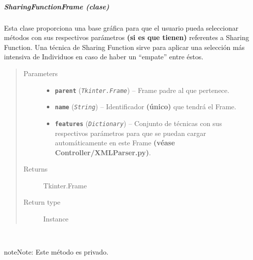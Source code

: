 \documentclass[class=report, crop=false]{standalone}
\begin{document}
\subparagraph{SharingFunctionFrame (clase)}
\label{sec:a_3_2_6_1_2}
\begin{fulllineitems}

\begin{DUlineblock}{0em}
\item[] Esta clase proporciona una base gráfica para que el 
usuario pueda seleccionar métodos con sus respectivos parámetros 
\textbf{(si es que tienen)} referentes a Sharing Function.\break         
Una técnica de Sharing Function sirve para aplicar una selección 
más intensiva de Individuos en caso de haber un ``empate'' entre 
éstos.
\end{DUlineblock}

\begin{quote}\begin{description}
\item[{Parameters}] \leavevmode\begin{itemize}
\item \textbf{\texttt{parent}} (\emph{\texttt{Tkinter.Frame}}) -- Frame padre al que pertenece.
\item \textbf{\texttt{name}} (\emph{\texttt{String}}) -- Identificador \textbf{(único)} que tendrá el Frame.
\item \textbf{\texttt{features}} (\emph{\texttt{Dictionary}}) -- Conjunto de técnicas con sus respectivos parámetros para que se puedan cargar automáticamente en este Frame \textbf{(véase Controller/XMLParser.py)}.
\end{itemize}

\item[{Returns}] \leavevmode
Tkinter.Frame
\item[{Return type}] \leavevmode
Instance
\end{description}\end{quote}


\begin{fulllineitems}

~

\begin{notice}{note}{Note:}
Este método es privado.
\end{notice}


\end{fulllineitems}
\end{fulllineitems}
\end{document}
